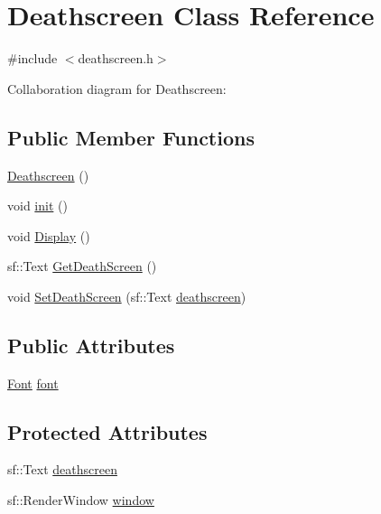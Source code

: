 \hypertarget{classDeathscreen}{}\section{Deathscreen Class Reference}
\label{classDeathscreen}


{\ttfamily \#include $<$deathscreen.\+h$>$}



Collaboration diagram for Deathscreen\+:
\subsection*{Public Member Functions}
\begin{DoxyCompactItemize}
\item 
\hyperlink{classDeathscreen_a8207a5dbf9a27ee7e03e04fde03577f3}{Deathscreen} ()
\item 
void \hyperlink{classDeathscreen_ad1207f9fe1079f345da4c074266fc3b2}{init} ()
\item 
void \hyperlink{classDeathscreen_ae4a02cb223cdddae82b69ed8225c1130}{Display} ()
\item 
sf\+::\+Text \hyperlink{classDeathscreen_aab15c247db90f8873bcd2fb5d40a829e}{Get\+Death\+Screen} ()
\item 
void \hyperlink{classDeathscreen_ac5afa125fcc6f893c8c8510caa2b0cd7}{Set\+Death\+Screen} (sf\+::\+Text \hyperlink{classDeathscreen_a3b5e7b13ab60f8e86bfbed95245bfb7a}{deathscreen})
\end{DoxyCompactItemize}
\subsection*{Public Attributes}
\begin{DoxyCompactItemize}
\item 
\hyperlink{classFont}{Font} \hyperlink{classDeathscreen_acee5dfcd2daf3847b0938d7824455966}{font}
\end{DoxyCompactItemize}
\subsection*{Protected Attributes}
\begin{DoxyCompactItemize}
\item 
sf\+::\+Text \hyperlink{classDeathscreen_a3b5e7b13ab60f8e86bfbed95245bfb7a}{deathscreen}
\item 
sf\+::\+Render\+Window \hyperlink{classDeathscreen_a02a136f33b2f3beab87af2518daae693}{window}
\end{DoxyCompactItemize}


